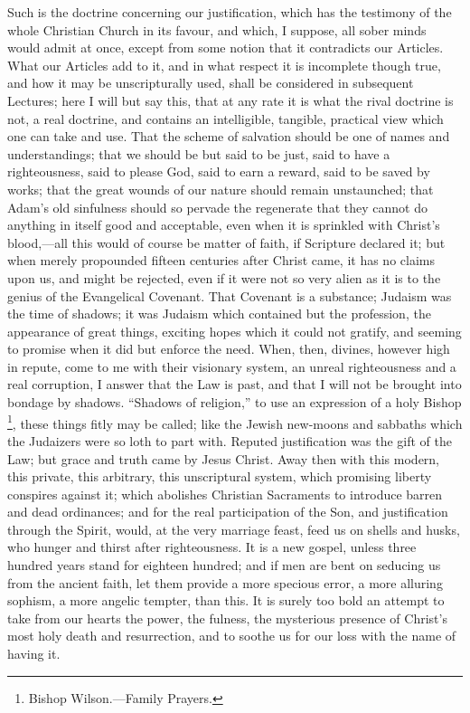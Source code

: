 Such is the doctrine concerning our justification, which has the
testimony of the whole Christian Church in its favour, and which, I
suppose, all sober minds would admit at once, except from some notion
that it contradicts our Articles. What our Articles add to it, and in
what respect it is incomplete though true, and how it may be
unscripturally used, shall be considered in subsequent Lectures; here
I will but say this, that at any rate it is what the rival doctrine is
not, a real doctrine, and contains an intelligible, tangible,
practical view which one can take and use. That the scheme of
salvation should be one of names and understandings; that we should be
but said to be just, said to have a righteousness, said to please God,
said to earn a reward, said to be saved by works; that the great
wounds of our nature should remain unstaunched; that Adam's old
sinfulness should so pervade the regenerate that they cannot do
anything in itself good and acceptable, even when it is sprinkled with
Christ's blood,—all this would of course be matter of faith, if
Scripture declared it; but when merely propounded fifteen centuries
after Christ came, it has no claims upon us, and might be rejected,
even if it were not so very alien as it is to the genius of the
Evangelical Covenant. That Covenant is a substance; Judaism was the
time of shadows; it was Judaism which contained but the
profession, the appearance of great things, exciting hopes which it
could not gratify, and seeming to promise when it did but enforce the
need. When, then, divines, however high in repute, come to me with
their visionary system, an unreal righteousness and a real corruption,
I answer that the Law is past, and that I will not be brought into
bondage by shadows. ``Shadows of religion,'' to use an
expression of a holy Bishop \footnote{Bishop
Wilson.—Family Prayers.},
these things fitly may be called; like the Jewish new-moons and
sabbaths which the Judaizers were so loth to part with. Reputed
justification was the gift of the Law; but grace and truth came by
Jesus Christ. Away then with this modern, this private, this
arbitrary, this unscriptural system, which promising liberty conspires
against it; which abolishes Christian Sacraments to introduce barren
and dead ordinances; and for the real participation of the Son, and
justification through the Spirit, would, at the very marriage feast,
feed us on shells and husks, who hunger and thirst after
righteousness. It is a new gospel, unless three hundred years stand
for eighteen hundred; and if men are bent on seducing us from the
ancient faith, let them provide a more specious error, a more alluring
sophism, a more angelic tempter, than this. It is surely too bold an
attempt to take from our hearts the power, the fulness, the mysterious
presence of Christ's most holy death and resurrection, and to soothe
us for our loss with the name of having it.

